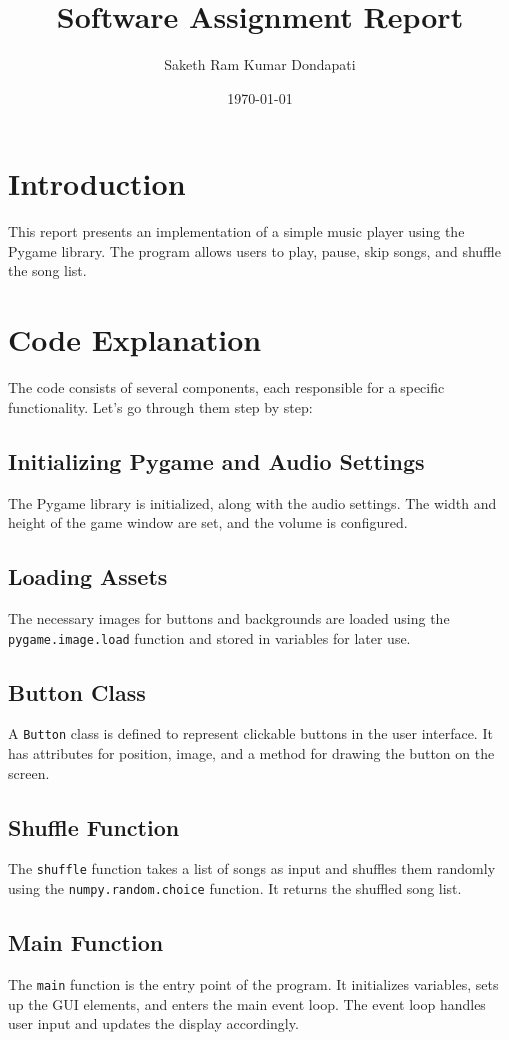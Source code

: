 \documentclass{article}
\title{Software Assignment Report}
\author{Saketh Ram Kumar Dondapati}
\date{\today}
\begin{document}
\maketitle

\section{Introduction}
This report presents an implementation of a simple music player using the Pygame library. The program allows users to play, pause, skip songs, and shuffle the song list.

\section{Code Explanation}
The code consists of several components, each responsible for a specific functionality. Let's go through them step by step:

\subsection{Initializing Pygame and Audio Settings}
The Pygame library is initialized, along with the audio settings. The width and height of the game window are set, and the volume is configured.

\subsection{Loading Assets}
The necessary images for buttons and backgrounds are loaded using the \texttt{pygame.image.load} function and stored in variables for later use.

\subsection{Button Class}
A \texttt{Button} class is defined to represent clickable buttons in the user interface. It has attributes for position, image, and a method for drawing the button on the screen.

\subsection{Shuffle Function}
The \texttt{shuffle} function takes a list of songs as input and shuffles them randomly using the \texttt{numpy.random.choice} function. It returns the shuffled song list.

\subsection{Main Function}
The \texttt{main} function is the entry point of the program. It initializes variables, sets up the GUI elements, and enters the main event loop. The event loop handles user input and updates the display accordingly.
\end{document}
